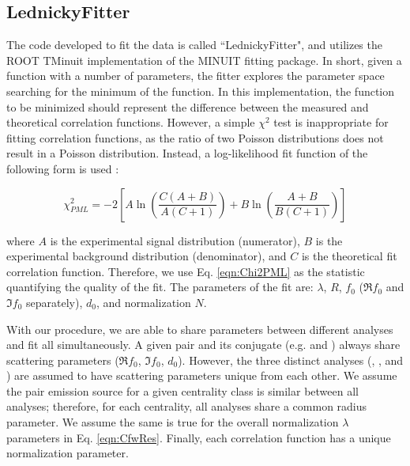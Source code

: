 \documentclass[/home/jesse/Analysis/FemtoAnalysis/AnalysisNotes/AnalysisNoteJBuxton.tex]{subfiles}
\begin{document}
\subsection{LednickyFitter}
\label{LednickyFitter}


The code developed to fit the data is called ``LednickyFitter", and utilizes the ROOT TMinuit implementation of the MINUIT fitting package.
In short, given a function with a number of parameters, the fitter explores the parameter space searching for the minimum of the function.
In this implementation, the function to be minimized should represent the difference between the measured and theoretical correlation functions.
However, a simple $\chi^{2}$ test is inappropriate for fitting correlation functions, as the ratio of two Poisson distributions does not result in a Poisson distribution.
Instead, a log-likelihood fit function of the following form is used \cite{Lisa:2005dd}:

\begin{equation}
 \chi^{2}_{PML} = -2\left[A\ln\left(\frac{C(A+B)}{A(C+1)}\right) + B\ln\left(\frac{A+B}{B(C+1)}\right)\right]
\label{eqn:Chi2PML}
\end{equation}

where $A$ is the experimental signal distribution (numerator), $B$ is the experimental background distribution (denominator), and $C$ is the theoretical fit correlation function.
Therefore, we use Eq. \ref{eqn:Chi2PML} as the statistic quantifying the quality of the fit.
The parameters of the fit are: $\lambda$, $R$, $f_{0}$ ($\Re f_{0}$ and $\Im f_{0}$ separately), $d_{0}$, and normalization $N$.

With our procedure, we are able to share parameters between different analyses and fit all simultaneously.
A given pair and its conjugate (e.g. \LamKchP and \ALamKchM) always share scattering parameters ($\Re f_{0}$, $\Im f_{0}$, $d_{0}$).
However, the three distinct analyses (\LamKchP, \LamKchM, and \LamKs) are assumed to have scattering parameters unique from each other.
We assume the pair emission source for a given centrality class is similar between all analyses; therefore, for each centrality, all \LamK analyses share a common radius parameter.
We assume the same is true for the overall normalization $\lambda$ parameters in Eq. \ref{eqn:CfwRes}.
Finally, each correlation function has a unique normalization parameter.
\end{document}
